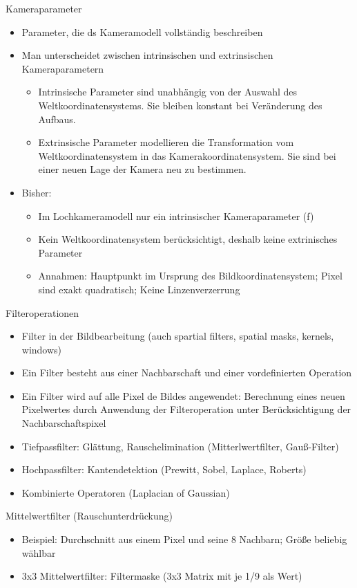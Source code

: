 \documentclass[paper=a4, fontsize=11pt]{scrartcl} %
\numberwithin{equation}{section} %
\numberwithin{figure}{section} %
\numberwithin{table}{section} %
\begin{document}
Kameraparameter
\begin{itemize}
\item Parameter, die ds Kameramodell vollständig beschreiben
\item Man unterscheidet zwischen intrinsischen und extrinsischen Kameraparametern
\begin{itemize}
\item Intrinsische Parameter sind unabhängig von der Auswahl des Weltkoordinatensystems. Sie bleiben konstant bei Veränderung des Aufbaus.
\item Extrinsische Parameter modellieren die Transformation vom Weltkoordinatensystem in das Kamerakoordinatensystem. Sie sind bei einer neuen Lage der Kamera neu zu bestimmen.
\end{itemize}
\item Bisher:
\begin{itemize}
\item Im Lochkameramodell nur ein intrinsischer Kameraparameter (f)
\item Kein Weltkoordinatensystem berücksichtigt, deshalb keine extrinisches Parameter
\item Annahmen: Hauptpunkt im Ursprung des Bildkoordinatensystem; Pixel sind exakt quadratisch; Keine Linzenverzerrung
\end{itemize}
\end{itemize}

Filteroperationen
\begin{itemize}
\item Filter in der Bildbearbeitung (auch spartial filters, spatial masks, kernels, windows)
\item Ein Filter besteht aus einer Nachbarschaft und einer vordefinierten Operation
\item Ein Filter wird auf alle Pixel de Bildes angewendet: Berechnung eines neuen Pixelwertes durch Anwendung der Filteroperation unter Berücksichtigung der Nachbarschaftspixel
\item Tiefpassfilter: Glättung, Rauschelimination (Mitterlwertfilter, Gauß-Filter)
\item Hochpassfilter: Kantendetektion (Prewitt, Sobel, Laplace, Roberts)
\item Kombinierte Operatoren (Laplacian of Gaussian)
\end{itemize}

Mittelwertfilter (Rauschunterdrückung)
\begin{itemize}
\item Beispiel: Durchschnitt aus einem Pixel und seine 8 Nachbarn; Größe beliebig wählbar
\item 3x3 Mittelwertfilter: Filtermaske (3x3 Matrix mit je 1/9 als Wert)
\end{itemize}
\end{document}
